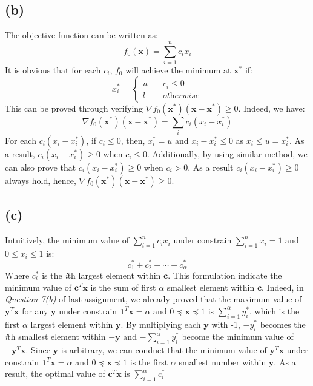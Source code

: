 \documentclass[10pt,a4paper]{article}
\begin{document}
\subsection*{(b)}
The objective function can be written as:
\begin{equation}
	f_{0}(\mathbf{x}) = \displaystyle\sum_{i = 1}^{n}c_{i} x_{i}
\end{equation}
It is obvious that for each $c_{i}$, $f_{0}$ will achieve the minimum at $\mathbf{x}^{*}$ if:
\begin{equation}
	x^{*}_{i} = 
	\begin{cases}
	u \quad & c_{i} \leq 0 \\
	l \quad & \textit{otherwise}
	\end{cases}
\end{equation}
This can be proved through verifying $\nabla f_{0}(\mathbf{x}^{*})(\mathbf{x} - \mathbf{x}^{*}) \geq 0$. Indeed, we have:
\begin{equation}
	\nabla f_{0}(\mathbf{x}^{*})(\mathbf{x} - \mathbf{x}^{*}) = \displaystyle\sum_{i}c_{i}(x_{i} - x^{*}_{i})
\end{equation}
For each $c_{i}(x_{i} - x^{*}_{i})$, if $c_{i} \leq 0$, then, $x^{*}_{i} = u$ and $x_{i} - x^{*}_{i} \leq 0$ as $x_{i} \leq u = x^{*}_{i}$. As a result, $c_{i}(x_{i} - x^{*}_{i}) \geq 0$ when $c_{i} \leq 0$. Additionally, by using similar method, we can also prove that $c_{i}(x_{i} - x^{*}_{i}) \geq 0$ when $c_{i} > 0$. As a result $c_{i}(x_{i} - x^{*}_{i}) \geq 0$ always hold, hence, $\nabla f_{0}(\mathbf{x}^{*})(\mathbf{x} - \mathbf{x}^{*}) \geq 0$.

\subsection*{(c)}
Intuitively, the minimum value of $\displaystyle\sum_{i = 1}^{n}c_{i}x_{i}$ under constrain $\displaystyle\sum_{i = 1}^{n} x_{i} = 1$ and $0 \leq x_{i} \leq 1$ is:
\begin{equation}
	c^{*}_{1} + c^{*}_{2} + \cdots + c^{*}_{\alpha}
	\label{optimal} 
\end{equation}
Where $c^{*}_{i}$ is the \textit{i}th largest element within $\mathbf{c}$. This formulation indicate the minimum value of $\mathbf{c}^{T} \mathbf{x}$ is the sum of first $\alpha$ smallest element within $\mathbf{c}$. Indeed, in \textit{Question 7(b)} of last assignment, we already proved that the maximum value of $\mathbf{y}^{T} \mathbf{x}$ for any $\mathbf{y}$ under constrain $\mathbf{1}^{T} \mathbf{x} = \alpha$ and $0 \preceq \mathbf{x} \preceq 1$ is $\displaystyle\sum_{i = 1}^{\alpha}y^{*}_{i}$, which is the first $\alpha$ largest element within $\mathbf{y}$. By multiplying each $\mathbf{y}$ with -1, $-y^{*}_{i}$ becomes the \textit{i}th smallest element within $-\mathbf{y}$ and $-\displaystyle\sum_{i = 1}^{\alpha}y^{*}_{i}$ become the minimum value of $-\mathbf{y}^{T} \mathbf{x}$. Since $\mathbf{y}$ is arbitrary, we can conduct that the minimum value of $\mathbf{y}^{T} \mathbf{x}$ under constrain $\mathbf{1}^{T} \mathbf{x} = \alpha$ and $0 \preceq \mathbf{x} \preceq 1$ is the first $\alpha$ smallest number within $\mathbf{y}$. As a result, the optimal value of $\mathbf{c}^{T} \mathbf{x}$ is $\displaystyle\sum_{i = 1}^{\alpha}c^{*}_{i}$
\end{document}
